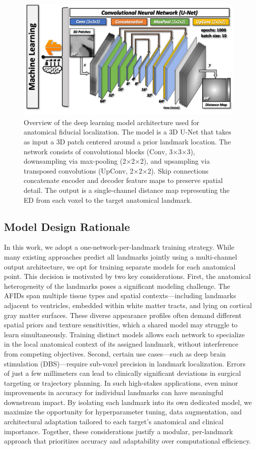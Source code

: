 \begin{figure}[hbt!]
    \centering
    \includegraphics[width=1\linewidth]{figs/ch3_Figure_cnn.png}
    \caption{Overview of the deep learning model architecture used for anatomical fiducial localization. The model is a 3D U-Net that takes as input a 3D patch centered around a prior landmark location. The network consists of convolutional blocks (Conv, 3×3×3), downsampling via max-pooling (2×2×2), and upsampling via transposed convolutions (UpConv, 2×2×2). Skip connections concatenate encoder and decoder feature maps to preserve spatial detail. The output is a single-channel distance map representing the ED from each voxel to the target anatomical landmark.}
    \label{fig:ch3_Figure_cnn}
\end{figure}


\subsection{Model Design Rationale}
In this work, we adopt a one-network-per-landmark training strategy. While many existing approaches predict all landmarks jointly using a multi-channel output architecture, we opt for training separate models for each anatomical point. This decision is motivated by two key considerations. First, the anatomical heterogeneity of the landmarks poses a significant modeling challenge. The AFIDs span multiple tissue types and spatial contexts—including landmarks adjacent to ventricles, embedded within white matter tracts, and lying on cortical gray matter surfaces. These diverse appearance profiles often demand different spatial priors and texture sensitivities, which a shared model may struggle to learn simultaneously. Training distinct models allows each network to specialize in the local anatomical context of its assigned landmark, without interference from competing objectives. Second, certain use cases—such as deep brain stimulation (DBS)—require sub-voxel precision in landmark localization. Errors of just a few millimeters can lead to clinically significant deviations in surgical targeting or trajectory planning. In such high-stakes applications, even minor improvements in accuracy for individual landmarks can have meaningful downstream impact. By isolating each landmark into its own dedicated model, we maximize the opportunity for hyperparameter tuning, data augmentation, and architectural adaptation tailored to each target's anatomical and clinical importance. Together, these considerations justify a modular, per-landmark approach that prioritizes accuracy and adaptability over computational efficiency.

